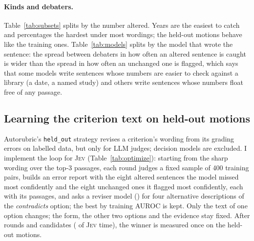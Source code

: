 \documentclass[11pt,a4paper]{article}
\newcommand{\jev}{\textsc{Jev}}
\begin{document}
\begin{table}[t]
\centering\small
{}
\caption{Detection at 0.7 / false alarm at 0.7 / AUROC by split and by the kind of number altered.}
\label{tab:subsets}
\end{table}

\begin{table}[t]
\centering\small
{}
\caption{By debater: how often its altered sentences are caught (detection at 0.7) and how often its unchanged ones are flagged, under the debate's wording and the sharp top-3 wording.}
\label{tab:models}
\end{table}

\paragraph{Kinds and debaters.} Table~\ref{tab:subsets} splits by the number altered. Years are the easiest to catch and percentages the hardest under most wordings; the held-out motions behave like the training ones. Table~\ref{tab:models} splits by the model that wrote the sentence: the spread between debaters in how often an altered sentence is caught is wider than the spread in how often an unchanged one is flagged, which says that some models write sentences whose numbers are easier to check against a library (a date, a named study) and others write sentences whose numbers float free of any passage.

\subsection{Learning the criterion text on held-out motions}
\label{sec:optimise}

Autorubric's \texttt{held\_out} strategy revises a criterion's wording from its grading errors on labelled data, but only for LLM judges; decision models are excluded. I implement the loop for \jev{} (Table~\ref{tab:optimize}): starting from the sharp wording over the top-3 passages, each round judges a fixed sample of 400 training pairs, builds an error report with the eight altered sentences the model missed most confidently and the eight unchanged ones it flagged most confidently, each with its passages, and asks a reviser model (\optReviser{}) for four alternative descriptions of the \emph{contradicts} option; the best by training AUROC is kept. Only the text of one option changes; the form, the other two options and the evidence stay fixed. After \optRounds{} rounds and \optCandidates{} candidates (\optJevCost{} of \jev{} time), the winner is measured once on the held-out motions.
\end{document}
